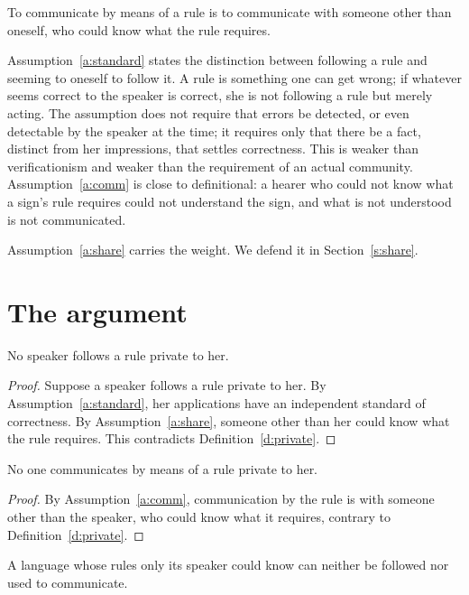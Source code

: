 \documentclass{situationist-preprint}
\begin{document}
\begin{assumption}[Communication]\label{a:comm}
To communicate by means of a rule is to communicate with someone other than oneself, who could know what the rule requires.
\end{assumption}

Assumption~\ref{a:standard} states the distinction between following a rule and seeming to oneself to follow it. A rule is something one can get wrong; if whatever seems correct to the speaker is correct, she is not following a rule but merely acting. The assumption does not require that errors be detected, or even detectable by the speaker at the time; it requires only that there be a fact, distinct from her impressions, that settles correctness. This is weaker than verificationism and weaker than the requirement of an actual community. Assumption~\ref{a:comm} is close to definitional: a hearer who could not know what a sign's rule requires could not understand the sign, and what is not understood is not communicated.

Assumption~\ref{a:share} carries the weight. We defend it in Section~\ref{s:share}.

\section{The argument}

\begin{theorem}\label{t:follow}
No speaker follows a rule private to her.
\end{theorem}

\begin{proof}
Suppose a speaker follows a rule private to her. By Assumption~\ref{a:standard}, her applications have an independent standard of correctness. By Assumption~\ref{a:share}, someone other than her could know what the rule requires. This contradicts Definition~\ref{d:private}.
\end{proof}

\begin{corollary}\label{c:comm}
No one communicates by means of a rule private to her.
\end{corollary}

\begin{proof}
By Assumption~\ref{a:comm}, communication by the rule is with someone other than the speaker, who could know what it requires, contrary to Definition~\ref{d:private}.
\end{proof}

\begin{theorem}\label{t:main}
A language whose rules only its speaker could know can neither be followed nor used to communicate.
\end{theorem}
\end{document}
